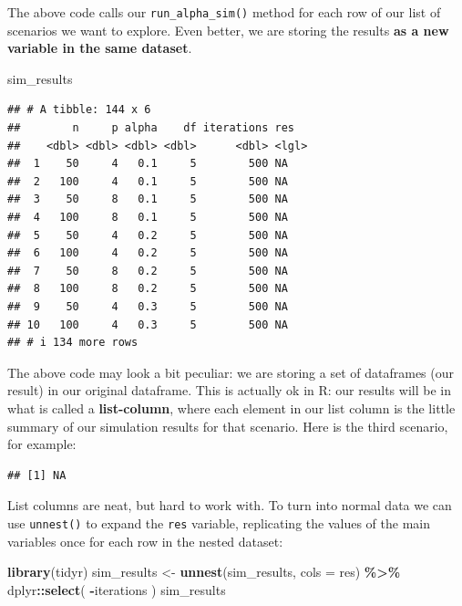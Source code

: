 \documentclass[
]{book}
\newenvironment{Shaded}{\begin{snugshade}}{\end{snugshade}}
\newcommand{\AttributeTok}[1]{\textcolor[rgb]{0.13,0.29,0.53}{#1}}
\newcommand{\DecValTok}[1]{\textcolor[rgb]{0.00,0.00,0.81}{#1}}
\newcommand{\FunctionTok}[1]{\textcolor[rgb]{0.13,0.29,0.53}{\textbf{#1}}}
\newcommand{\NormalTok}[1]{#1}
\newcommand{\OtherTok}[1]{\textcolor[rgb]{0.56,0.35,0.01}{#1}}
\newcommand{\SpecialCharTok}[1]{\textcolor[rgb]{0.81,0.36,0.00}{\textbf{#1}}}
\begin{document}
The above code calls our \texttt{run\_alpha\_sim()} method for each row of our list of scenarios we want to explore.
Even better, we are storing the results \textbf{as a new variable in the same dataset}.

\begin{Shaded}
\begin{Highlighting}[]
\NormalTok{sim\_results}
\end{Highlighting}
\end{Shaded}

\begin{verbatim}
## # A tibble: 144 x 6
##        n     p alpha    df iterations res  
##    <dbl> <dbl> <dbl> <dbl>      <dbl> <lgl>
##  1    50     4   0.1     5        500 NA   
##  2   100     4   0.1     5        500 NA   
##  3    50     8   0.1     5        500 NA   
##  4   100     8   0.1     5        500 NA   
##  5    50     4   0.2     5        500 NA   
##  6   100     4   0.2     5        500 NA   
##  7    50     8   0.2     5        500 NA   
##  8   100     8   0.2     5        500 NA   
##  9    50     4   0.3     5        500 NA   
## 10   100     4   0.3     5        500 NA   
## # i 134 more rows
\end{verbatim}

The above code may look a bit peculiar: we are storing a set of dataframes (our result) in our original dataframe.
This is actually ok in R: our results will be in what is called a \textbf{list-column}, where each element in our list column is the little summary of our simulation results for that scenario.
Here is the third scenario, for example:

\begin{Shaded}
\end{Shaded}

\begin{verbatim}
## [1] NA
\end{verbatim}

List columns are neat, but hard to work with.
To turn into normal data we can use \texttt{unnest()} to expand the \texttt{res} variable, replicating the values of the main variables once for each row in the nested dataset:

\begin{Shaded}
\begin{Highlighting}[]
\FunctionTok{library}\NormalTok{(tidyr)}
\NormalTok{sim\_results }\OtherTok{\textless{}{-}} \FunctionTok{unnest}\NormalTok{(sim\_results, }\AttributeTok{cols =}\NormalTok{ res) }\SpecialCharTok{\%\textgreater{}\%}
\NormalTok{  dplyr}\SpecialCharTok{::}\FunctionTok{select}\NormalTok{( }\SpecialCharTok{{-}}\NormalTok{iterations )}
\NormalTok{sim\_results}
\end{Highlighting}
\end{Shaded}
\end{document}
